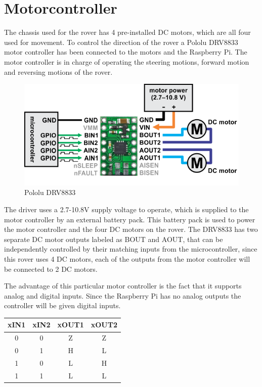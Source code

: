 \clearpage
\section{Motorcontroller}

The chassis used for the rover has 4 pre-installed DC motors, which are all four used for movement. To control the direction of the rover a Pololu DRV8833 motor controller has been connected to the motors and the Raspberry Pi. The motor controller is in charge of operating the steering motions, forward motion and reversing motions of the rover.

\begin{figure}[H]
	\centering
	\includegraphics[width=.8\linewidth]{images/DRV8833.png}
	\caption{Pololu DRV8833\cite{DRV8833pic}}
\end{figure}

The driver uses a 2.7-10.8V supply voltage to operate, which is supplied to the motor controller by an external battery pack. This battery pack is used to power the motor controller and the four DC motors on the rover. The DRV8833 has two separate DC motor outputs labeled as BOUT and AOUT, that can be independently controlled by their matching inputs from the microcontroller, since this rover uses 4 DC motors, each of the outputs from the motor controller will be connected to 2 DC motors.

The advantage of this particular motor controller is the fact that it supports analog and digital inputs. Since the Raspberry Pi has no analog outputs the controller will be given digital inputs. 

\begin{table}[H]
\centering
\begin{tabular}{|c|c|c|c|}
\hline
xIN1 & xIN2 & xOUT1 & xOUT2 \\ \hline
0    & 0    & Z     & Z     \\ \hline
0    & 1    & H     & L     \\ \hline
1    & 0    & L     & H     \\ \hline
1    & 1    & L     & L     \\ \hline
\end{tabular}
\end{table}

